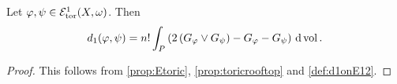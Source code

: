 \begin{corollary}\label{cor:toricd1}
    Let $\varphi,\psi\in \mathcal{E}^1_{\mathrm{tor}}(X,\omega)$. Then
    \[
        d_1(\varphi,\psi)= n!\int_P \left( 2\left(G_{\varphi}\lor G_{\psi}\right)-G_{\varphi}-G_{\psi}\right)\,\mathrm{d}\operatorname{vol}.
    \]
\end{corollary}
\begin{proof}
    This follows from \cref{prop:Etoric}, \cref{prop:toricrooftop} and \cref{def:d1onE12}.
\end{proof}
